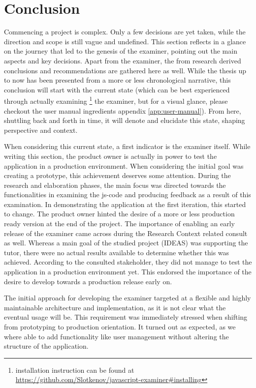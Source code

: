 \chapter{Conclusion}

Commencing a project is complex. Only a few decisions are yet taken, while
the direction and scope is still vague and undefined. This section reflects in a 
glance on the journey that led to the genesis of the \gls{examiner}, pointing 
out the main aspects and key decisions. Apart from the \gls{examiner}, the from 
research derived conclusions and recommendations are gathered here as well. 
While the thesis up to now has been presented from a more or less chronological
narrative, this conclusion will start with the current state (which can be best
experienced through actually 
examining \footnote{installation instruction can be found at
\url{https://github.com/Slotkenov/javascript-examiner\#installing}}
the \gls{examiner}, but for a visual glance,
please checkout the user manual ingredients appendix \ref{app:user-manual}). From
here, shuttling back and forth in time, it will denote and elucidate this state,
shaping perspective and context.

When considering this current state, a first indicator is the \gls{examiner}
itself. While writing this section, the product owner is actually in power to
test the application in a production environment. When considering the
initial goal was creating a prototype, this achievement deserves some attention.
During the research and elaboration phases, the main focus was directed towards 
the functionalities in examining the \gls{js-code} and producing \gls{feedback}
as a result of this examination. In demonstrating the application at the
first iteration, this started to change. The product owner hinted the desire of
a more or less production ready version at the end of the project. The 
importance of enabling an early release of the \gls{examiner} came across
during the Research Context related consult as well. Whereas a main goal of the
studied project (IDEAS) was supporting the \gls{tutor}, there were no actual
results available to determine whether this was achieved. According to the
consulted stakeholder, they did not manage to test the application in a 
production environment yet. This endorsed the importance of the desire to 
develop towards a production release early on.

The initial approach for developing the \gls{examiner} targeted at a flexible
and highly maintainable architecture and implementation, as it is not clear
what the eventual usage will be. This requirement was immediately stressed
when shifting from prototyping to production orientation. It turned out as
expected, as we where able to add functionality like user management without 
altering the structure of the application.

